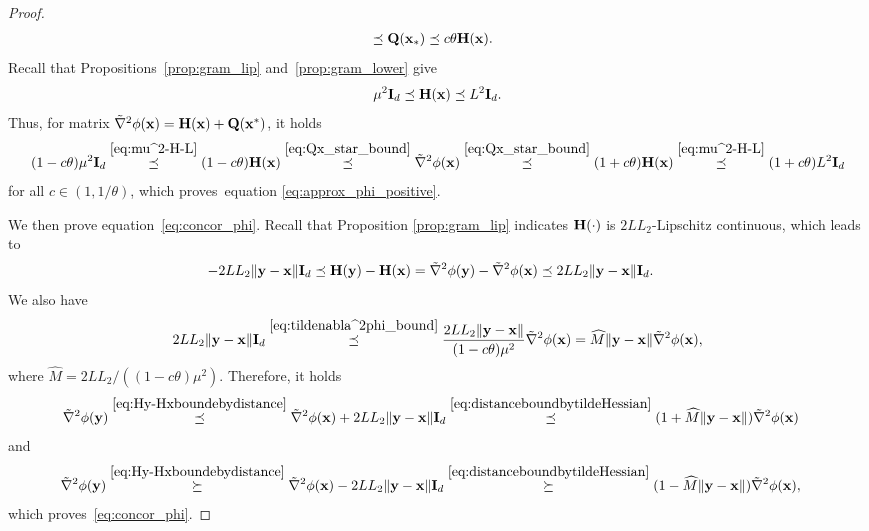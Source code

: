 \documentclass[11pt]{article}
\theoremstyle{plain}
\theoremstyle{definition}
\theoremstyle{remark}
\theoremstyle{plain}
\def\H{{\bf H}}
\def\I{{\bf I}}
\def\Q{{\bf Q}}
\def\x{{\bf x}}
\def\y{{\bf y}}
\begin{document}
\begin{proof}
\begin{align}
&\preceq\Q(\x_*)\preceq c\theta\H(\x).
\end{align}
Recall that Propositions~\ref{prop:gram_lip} and~\ref{prop:gram_lower} give
\begin{align}\label{eq:mu^2-H-L}
\mu^2\I_d\preceq\H(\x)\preceq L^2\I_d.    
\end{align}
Thus, for matrix $\tilde{\nabla}^2\phi(\x) = \H(\x)+\Q(\x^*)$, it holds
\begin{align}
    \label{eq:tildenabla^2phi_bound}
(1-c\theta)\mu^2\I_d
\overset{\eqref{eq:mu^2-H-L}}\preceq(1-c\theta)\H(\x)
\overset{\eqref{eq:Qx_star_bound}}{\preceq}\tilde{\nabla}^2\phi(\x)\overset{\eqref{eq:Qx_star_bound}}{\preceq}(1+c\theta)\H(\x)
\overset{\eqref{eq:mu^2-H-L}}\preceq(1+c\theta)L^2\I_d
\end{align}
for all $c\in(1,1/\theta)$,
which proves~equation \eqref{eq:approx_phi_positive}.

We then prove equation~\eqref{eq:concor_phi}.
Recall that Proposition \ref{prop:gram_lip} indicates $\H(\cdot)$ is $2LL_2$-Lipschitz continuous, which leads to
\begin{align}
\label{eq:Hy-Hxboundebydistance}
-2LL_2\|\y-\x\|\I_d
&\preceq\H(\y)-\H(\x)
=\tilde{\nabla}^2\phi(\y)-\tilde{\nabla}^2\phi(\x)
\preceq2LL_2\|\y-\x\|\I_d.
\end{align}
We also have
\begin{align}
\label{eq:distanceboundbytildeHessian}
2LL_2\|\y-\x\|\I_d
\overset{\eqref{eq:tildenabla^2phi_bound}}{\preceq}\frac{2LL_2\|\y-\x\|}{(1-c\theta)\mu^2}
\tilde{\nabla}^2\phi(\x)=\widehat M\|\y-\x\|\tilde{\nabla}^2\phi(\x),
\end{align}
where $\widehat M= 2LL_2/((1-c\theta)\mu^2)$.
Therefore, it holds
\begin{align*}
\tilde{\nabla}^2\phi(\y)
&\overset{\eqref{eq:Hy-Hxboundebydistance}}{\preceq}\tilde{\nabla}^2\phi(\x)+2LL_2\|\y-\x\|\I_d
\overset{\eqref{eq:distanceboundbytildeHessian}}{\preceq}(1+\widehat M\|\y-\x\|)\tilde{\nabla}^2\phi(\x)
\end{align*}
and
\begin{align*}
\tilde{\nabla}^2\phi(\y)
&\overset{\eqref{eq:Hy-Hxboundebydistance}}{\succeq}\tilde{\nabla}^2\phi(\x)-2LL_2\|\y-\x\|\I_d
\overset{\eqref{eq:distanceboundbytildeHessian}}{\succeq}(1-\widehat M\|\y-\x\|)\tilde{\nabla}^2\phi(\x),
\end{align*}
which proves~\eqref{eq:concor_phi}.
\end{proof}
\end{document}
